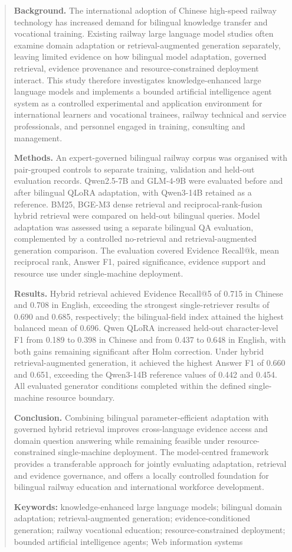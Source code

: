 
\begin{abstract}

\textbf{Background.} The international adoption of Chinese high-speed railway technology has increased demand for bilingual knowledge transfer and vocational training. Existing railway large language model studies often examine domain adaptation or retrieval-augmented generation separately, leaving limited evidence on how bilingual model adaptation, governed retrieval, evidence provenance and resource-constrained deployment interact. This study therefore investigates knowledge-enhanced large language models and implements a bounded artificial intelligence agent system as a controlled experimental and application environment for international learners and vocational trainees, railway technical and service professionals, and personnel engaged in training, consulting and management.

\textbf{Methods.} An expert-governed bilingual railway corpus was organised with pair-grouped controls to separate training, validation and held-out evaluation records. Qwen2.5-7B and GLM-4-9B were evaluated before and after bilingual QLoRA adaptation, with Qwen3-14B retained as a reference. BM25, BGE-M3 dense retrieval and reciprocal-rank-fusion hybrid retrieval were compared on held-out bilingual queries. Model adaptation was assessed using a separate bilingual QA evaluation, complemented by a controlled no-retrieval and retrieval-augmented generation comparison. The evaluation covered Evidence Recall@k, mean reciprocal rank, Answer F1, paired significance, evidence support and resource use under single-machine deployment.

\textbf{Results.} Hybrid retrieval achieved Evidence Recall@5 of 0.715 in Chinese and 0.708 in English, exceeding the strongest single-retriever results of 0.690 and 0.685, respectively; the bilingual-field index attained the highest balanced mean of 0.696. Qwen QLoRA increased held-out character-level F1 from 0.189 to 0.398 in Chinese and from 0.437 to 0.648 in English, with both gains remaining significant after Holm correction. Under hybrid retrieval-augmented generation, it achieved the highest Answer F1 of 0.660 and 0.651, exceeding the Qwen3-14B reference values of 0.442 and 0.454. All evaluated generator conditions completed within the defined single-machine resource boundary.

\textbf{Conclusion.} Combining bilingual parameter-efficient adaptation with governed hybrid retrieval improves cross-language evidence access and domain question answering while remaining feasible under resource-constrained single-machine deployment. The model-centred framework provides a transferable approach for jointly evaluating adaptation, retrieval and evidence governance, and offers a locally controlled foundation for bilingual railway education and international workforce development.

\textbf{Keywords:} knowledge-enhanced large language models; bilingual domain adaptation; retrieval-augmented generation; evidence-conditioned generation; railway vocational education; resource-constrained deployment; bounded artificial intelligence agents; Web information systems

\end{abstract}
